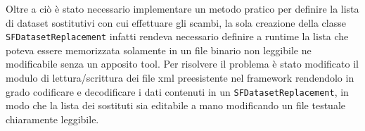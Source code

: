 Oltre a ci\`o \`e stato necessario implementare un metodo pratico per definire la lista di dataset sostitutivi con cui effettuare gli scambi, la sola creazione della classe \texttt{SFDatasetReplacement} infatti rendeva necessario definire a runtime la lista che poteva essere memorizzata solamente in un file binario non leggibile ne modificabile senza un apposito tool. Per risolvere il problema \`e stato modificato il modulo di lettura/scrittura dei file xml preesistente nel framework rendendolo in grado codificare e decodificare i dati contenuti in un \texttt{SFDatasetReplacement}, in modo che la lista dei sostituti sia editabile a mano modificando un file testuale chiaramente leggibile.

